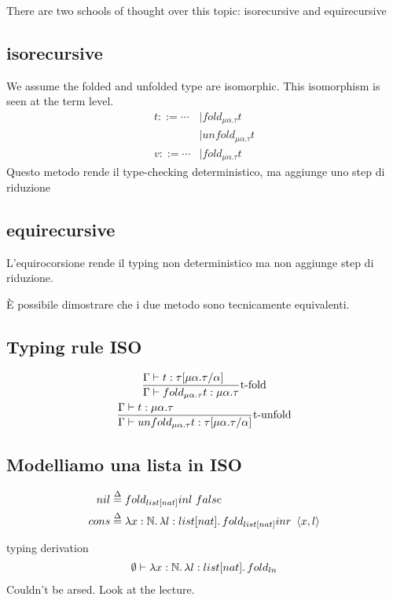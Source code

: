 \documentclass{article}
\newcommand{\st}[3][]{\ensuremath \displaystyle\frac{#3\hfill}{#2\hfill} \text{#1}}
\newcommand{\N}{\ensuremath \mathbb N}
\begin{document}
There are two schools of thought over this topic: isorecursive and equirecursive

\subsection{isorecursive}
We assume the folded and unfolded type are isomorphic. This isomorphism is seen at the term level.
\begin{align*}
    t ::=\cdots &|fold_{\mu\alpha.\tau}t \\
                &|unfold_{\mu\alpha.\tau} t \\
    v ::= \cdots &|fold_{\mu\alpha.\tau} t
\end{align*}
Questo metodo rende il type-checking deterministico, ma aggiunge uno step di riduzione

\subsection{equirecursive}
L'equirocorsione rende il typing non deterministico ma non aggiunge step di riduzione. 

È possibile dimostrare che i due metodo sono tecnicamente equivalenti.

\subsection{Typing rule ISO}
\begin{gather*}
    \st[t-fold]{
        \Gamma\vdash fold_{\mu\alpha.\tau} t : \mu\alpha.\tau
    }{
        \Gamma\vdash t:\tau[\mu\alpha.\tau/\alpha]
    } \\
    \st[t-unfold]{
        \Gamma\vdash unfold_{\mu\alpha.\tau}t:\tau[\mu\alpha.\tau/\alpha]
    }{
        \Gamma\vdash t:\mu\alpha.\tau
    } \\
\end{gather*}

\subsection{Modelliamo una lista in ISO}
\begin{align*}
    nil &\overset\Delta=fold_{list[nat]}\inl false \\
    cons &\overset\Delta= \lam{x:\N}\lam{l:list[nat]}{fold_{list[nat]}\inr\pair{x, l}}
\end{align*}

\begin{callout}{typing derivation}
    \begin{align*}
        \emptyset\vdash\lam{x:\N}\lam{l:list[nat]}{fold_{ln}}
    \end{align*}
    Couldn't be arsed. Look at the lecture.
\end{callout}
\end{document}
